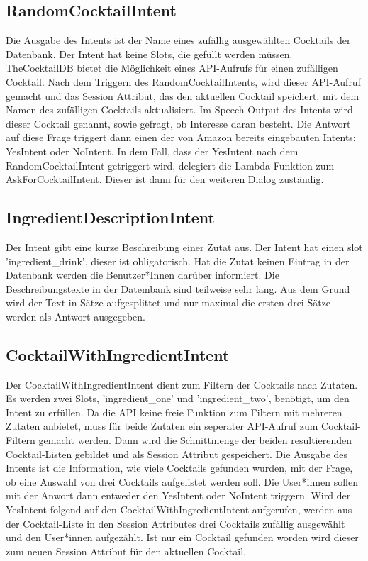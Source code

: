 \documentclass[12pt,letterpaper]{article}
\begin{document}
\subsection{RandomCocktailIntent}
Die Ausgabe des Intents ist der Name eines zufällig ausgewählten Cocktails der Datenbank. Der Intent hat keine Slots, die gefüllt werden müssen. TheCocktailDB bietet die Möglichkeit eines API-Aufrufs für einen zufälligen Cocktail. Nach dem Triggern des RandomCocktailIntents, wird dieser API-Aufruf gemacht und das Session Attribut, das den aktuellen Cocktail speichert, mit dem Namen des zufälligen Cocktails aktualisiert. Im Speech-Output des Intents wird dieser Cocktail genannt, sowie gefragt, ob Interesse daran besteht. Die Antwort auf diese Frage triggert dann einen der von Amazon bereits eingebauten Intents: YesIntent oder NoIntent. In dem Fall, dass der YesIntent nach dem RandomCocktailIntent getriggert wird, delegiert die Lambda-Funktion zum AskForCocktailIntent. Dieser ist dann für den weiteren Dialog zuständig. 
\subsection{IngredientDescriptionIntent}
Der Intent gibt eine kurze Beschreibung einer Zutat aus. Der Intent hat einen slot 'ingredient\_drink', dieser ist obligatorisch. Hat die Zutat keinen Eintrag in der Datenbank werden die Benutzer*Innen darüber informiert. Die Beschreibungstexte in der Datembank sind teilweise sehr lang. Aus dem Grund wird der Text in Sätze aufgesplittet und nur maximal die ersten drei Sätze werden als Antwort ausgegeben.
\subsection{CocktailWithIngredientIntent}
Der CocktailWithIngredientIntent dient zum Filtern der Cocktails nach Zutaten. Es werden zwei Slots, 'ingredient\_one' und 'ingredient\_two', benötigt, um den Intent zu erfüllen. Da die API keine freie Funktion zum Filtern mit mehreren Zutaten anbietet, muss für beide Zutaten ein seperater API-Aufruf zum Cocktail-Filtern gemacht werden. Dann wird die Schnittmenge der beiden resultierenden Cocktail-Listen gebildet und als Session Attribut gespeichert. Die Ausgabe des Intents ist die Information, wie viele Cocktails gefunden wurden, mit der Frage, ob eine Auswahl von drei Cocktails aufgelistet werden soll. Die User*innen sollen mit der Anwort dann entweder den YesIntent oder NoIntent triggern. Wird der YesIntent folgend auf den CocktailWithIngredientIntent aufgerufen, werden aus der Cocktail-Liste in den Session Attributes drei Cocktails zufällig ausgewählt und den User*innen aufgezählt. Ist nur ein Cocktail gefunden worden wird dieser zum neuen Session Attribut für den aktuellen Cocktail.
\end{document}
